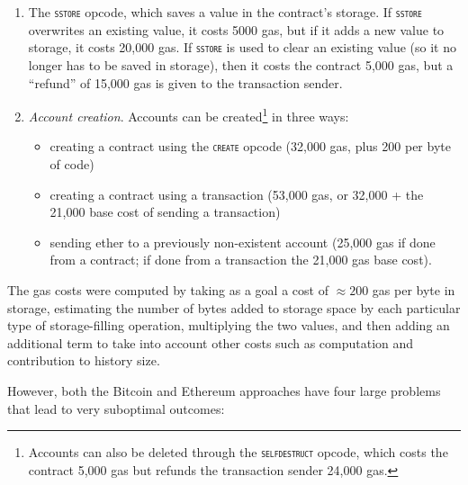 \documentclass[12pt, final]{article}
\newcommand{\opcode}[1]{\textsc{\texttt{#1}}}
\begin{document}
\begin{enumerate}
    \item The \opcode{sstore} opcode, which saves a value in the contract's storage. If \opcode{sstore} overwrites an existing value, it costs 5000 gas, but if it adds a new value to storage, it costs 20,000 gas. If \opcode{sstore} is used to clear an existing value (so it no longer has to be saved in storage), then it costs the contract 5,000 gas, but a ``refund'' of 15,000 gas is given to the transaction sender.

    \item \emph{Account creation}. Accounts can be created\footnote{Accounts can also be deleted through the \opcode{selfdestruct} opcode, which costs the contract 5,000 gas but refunds the transaction sender 24,000 gas.} in three ways:

    \begin{itemize}
        \item creating a contract using the \opcode{create} opcode (32,000 gas, plus 200 per byte of code)
        \item creating a contract using a transaction (53,000 gas, or 32,000 + the 21,000 base cost of sending a transaction)
        \item sending ether to a previously non-existent account (25,000 gas if done from a contract; if done from a transaction the 21,000 gas base cost).

    \end{itemize}

\end{enumerate}

The gas costs were computed by taking as a goal a cost of $\approx 200$ gas per byte in storage, estimating the number of bytes added to storage space by each particular type of storage-filling operation, multiplying the two values, and then adding an additional term to take into account other costs such as computation and contribution to history size.

However, both the Bitcoin and Ethereum approaches have four large problems that lead to very suboptimal outcomes:
\end{document}
